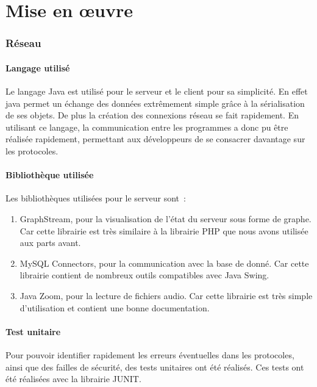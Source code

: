 \documentclass[a4paper,11pt]{report}
\title{}
\author{}
\begin{document}
\maketitle
\tableofcontents

\begin{abstract}
\end{abstract}

\chapter{Mise en œuvre}

\subsection{Réseau}

\subsubsection{Langage utilisé}
Le langage Java est utilisé pour le serveur et le client pour sa simplicité. En effet java permet un échange des données extrêmement simple grâce à la sérialisation de ses objets. De plus la création des connexions réseau se fait rapidement.
En utilisant ce langage, la communication entre les programmes a donc pu être réalisée rapidement, permettant aux développeurs de se consacrer davantage sur les protocoles.

\subsubsection{Bibliothèque utilisée}
Les bibliothèques utilisées pour le serveur sont :
\begin{enumerate}
  \item GraphStream, pour la visualisation de l'état du serveur sous forme de graphe. Car cette librairie est très similaire à la librairie PHP que nous avons utilisée aux parts avant.
  \item MySQL Connectors, pour la communication avec la base de donné. Car cette librairie contient de nombreux outils compatibles avec Java Swing.
  \item Java Zoom, pour la lecture de fichiers audio. Car cette librairie est très simple d’utilisation et contient une bonne documentation.
\end{enumerate}

\subsubsection{Test unitaire}
Pour pouvoir identifier rapidement les erreurs éventuelles dans les protocoles, ainsi que des failles de sécurité, des tests unitaires ont été réalisés. Ces tests ont été réalisées avec la librairie JUNIT. 
\end{document}
